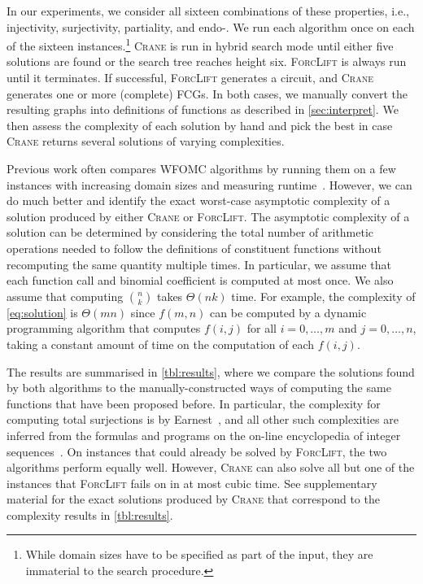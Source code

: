 \documentclass{article}
\theoremstyle{definition}
\theoremstyle{remark}
\begin{document}
In our experiments, we consider all sixteen combinations of these properties,
i.e., injectivity, surjectivity, partiality, and endo-. We run each algorithm
once on each of the sixteen instances.\footnote{While domain sizes have to be
  specified as part of the input, they are immaterial to the search procedure.}
\textsc{Crane} is run in hybrid search mode until either five solutions are
found or the search tree reaches height six. \textsc{ForcLift} is always run
until it terminates. If successful, \textsc{ForcLift} generates a circuit, and
\textsc{Crane} generates one or more (complete) FCGs. In both cases, we manually
convert the resulting graphs into definitions of functions as described in
\cref{sec:interpret}. We then assess the complexity of each solution by hand and
pick the best in case \textsc{Crane} returns several solutions of varying
complexities.

Previous work often compares WFOMC algorithms by running them on a few instances
with increasing domain sizes and measuring
runtime~\cite{DBLP:conf/nips/Broeck11,DBLP:conf/ijcai/BroeckTMDR11,DBLP:conf/aaai/BroeckD12}.
However, we can do much better and identify the exact worst-case asymptotic
complexity of a solution produced by either \textsc{Crane} or \textsc{ForcLift}.
The asymptotic complexity of a solution can be determined by considering the
total number of arithmetic operations needed to follow the definitions of
constituent functions without recomputing the same quantity multiple times. In
particular, we assume that each function call and binomial coefficient is
computed at most once. We also assume that computing $\binom{n}{k}$ takes
$\Theta(nk)$ time. For example, the complexity of \cref{eq:solution} is
$\Theta(mn)$ since $f(m, n)$ can be computed by a dynamic programming algorithm
that computes $f(i, j)$ for all $i = 0, \dots, m$ and $j = 0, \dots, n$, taking
a constant amount of time on the computation of each $f(i, j)$.

The results are summarised in \cref{tbl:results}, where we compare the solutions
found by both algorithms to the manually-constructed ways of computing the same
functions that have been proposed before. In particular, the complexity for
computing total surjections is by Earnest~, and all other such
complexities are inferred from the formulas and programs on the on-line
encyclopedia of integer sequences~\cite{oeis}. On instances that could already
be solved by \textsc{ForcLift}, the two algorithms perform equally well.
However, \textsc{Crane} can also solve all but one of the instances that
\textsc{ForcLift} fails on in at most cubic time. See supplementary material for
the exact solutions produced by \textsc{Crane} that correspond to the complexity
results in \cref{tbl:results}.
\end{document}
